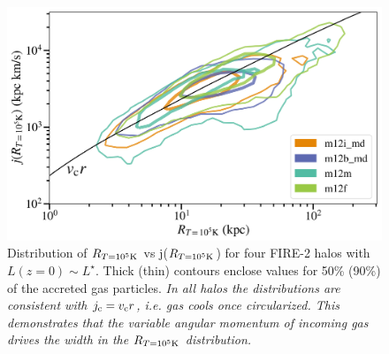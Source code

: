 \documentclass[fleqn,usenatbib]{mnras}
\newcommand{\Rcool}{R_{T=10^5 {\rm K}}}
\begin{document}
\begin{figure}
    \centering
    \includegraphics[width=\columnwidth]{figures/j_vs_rcondense.png}
    \caption{
    Distribution of $\Rcool$ vs j($\Rcool$) for four FIRE-2 halos with $L(z=0) \sim L^\star$.
Thick (thin) contours enclose values for 50\% (90\%) of the accreted gas particles.
\textit{
In all halos the distributions are consistent with $j_{\rm c} = v_{\rm c} r$, i.e. gas cools once circularized.
This demonstrates that the variable angular momentum of incoming gas drives the width in the $\Rcool$ distribution.
}
    }
    \label{f:Rcool}
\end{figure}
\end{document}
